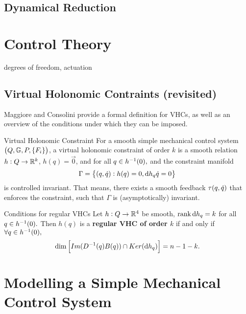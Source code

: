\documentclass[main.tex]{subfiles}
\begin{document}
\subsection{Dynamical Reduction}
\section{Control Theory}
        degrees of freedom, actuation
\subsection{Virtual Holonomic Contraints (revisited)}\label{vhc-section}
Maggiore and Consolini provide a formal definition for VHCs, as well as an overview of the conditions under which they can be imposed\cite{maggiore2012virtual}.

\begin{boxdef}{Virtual Holonomic Constraint \cite{maggiore2012virtual}}
For a smooth simple mechanical control system $\del{Q,\mbbg,P,\cbr{F_i}}$, a virtual holonomic constraint of order $k$ is a smooth relation $h:Q\to\mathbb{R}^k$,
$h(q)=\vec{0}$, and for all $q\in h^{-1}(0),$ and the constraint manifold
\begin{align}
    \Gamma=\cbr{(q,\qd):h(q)=0,\dd h_q\qd=0}
\end{align}
is controlled invariant. That means, there exists a smooth feedback $\tau(q,\dot q)$ that enforces the constraint, such that $\Gamma$ is (asymptotically) invariant.
\end{boxdef}
\begin{boxthm}{Conditions for regular VHCs \cite{maggiore2012virtual}}
Let $h:Q\to\mathbb{R}^4$ be smooth, $\rank \dd h_q=k$ for all $q\in h^{-1}(0).$ Then $h(q)$ is a \textbf{regular VHC of order $k$} if and only if $\forall q\in h^{-1}(0),$
\begin{align}
     \dim\sbr{Im(D\inv(q)B(q))\cap Ker(\dd h_q)}=n-1-k.
\end{align}
\end{boxthm}

\section{Modelling a Simple Mechanical Control System}
\end{document}
